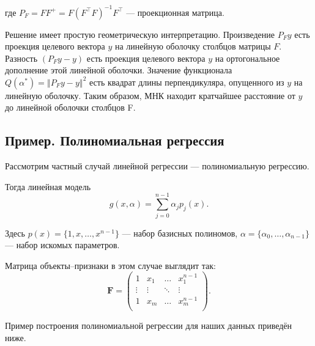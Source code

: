 \documentclass[11pt,a4paper]{article}
\begin{document}
где \(P_F = FF^{+} = F(F^{\top}F)^{-1}F^{\top}\) --- проекционная
матрица.

Решение имеет простую геометрическую интерпретацию.
Произведение \(P_Fy\) есть проекция целевого вектора \(y\) на линейную оболочку
столбцов матрицы \(F\).
Разность \((P_Fy-y)\) есть проекция целевого вектора \(y\) на ортогональное дополнение этой линейной оболочки.
Значение функционала \(Q(\alpha^*) = \left\Vert P_Fy - y \right\Vert^2\)
есть квадрат длины перпендикуляра, опущенного из \(y\) на линейную
оболочку.
Таким образом, МНК находит кратчайшее расстояние от \(y\) до линейной оболочки столбцов F.

    \hypertarget{ux43fux440ux438ux43cux435ux440.-ux43fux43eux43bux438ux43dux43eux43cux438ux430ux43bux44cux43dux430ux44f-ux440ux435ux433ux440ux435ux441ux441ux438ux44f}{%
\subsection{Пример. Полиномиальная
регрессия}\label{ux43fux440ux438ux43cux435ux440.-ux43fux43eux43bux438ux43dux43eux43cux438ux430ux43bux44cux43dux430ux44f-ux440ux435ux433ux440ux435ux441ux441ux438ux44f}}

Рассмотрим частный случай линейной регрессии --- полиномиальную
регрессию.

Тогда линейная модель
\[ g(x, \alpha) = \sum_{j=0}^{n-1} \alpha_j p_j(x).\]

Здесь \(p(x) = \{1, x, \ldots, x^{n-1}\}\) --- набор базисных полиномов,
\(\alpha = \{\alpha_0, \ldots, \alpha_{n-1}\}\) --- набор искомых
параметров.

Матрица объекты--признаки в этом случае выглядит так: \[
  \mathbf{F} =
  \begin{pmatrix}
    1      & x_1    & \ldots & x_1^{n-1} \\
    \vdots & \vdots & \ddots & \vdots    \\
    1      & x_m    & \ldots & x_m^{n-1} \\
  \end{pmatrix}.
\]

Пример построения полиномиальной регрессии для наших данных приведён
ниже.
\end{document}
